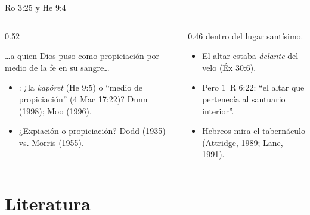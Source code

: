 \begin{frame}{Ro 3:25 y He 9:4}
\begin{columns}[t,onlytextwidth]
\begin{column}{0.52\textwidth}
\begin{cita}\ldots{}a quien Dios puso como propiciación por medio de la fe en su sangre\ldots{}\end{cita}
\scriptsize
\begin{itemize}
\item {}: ¿la \emph{kapóret} (He 9:5) o ``medio de propiciación'' (4 Mac 17:22)? Dunn (1998); Moo (1996).
\item ¿Expiación o propiciación? Dodd (1935) vs. Morris (1955).
\end{itemize}
\end{column}
\begin{column}{0.46\textwidth}\scriptsize
{} dentro del lugar santísimo.
\begin{itemize}
\item El altar estaba \emph{delante} del velo (Éx 30:6).
\item Pero 1~R 6:22: ``el altar que pertenecía al santuario interior''.
\item Hebreos mira el tabernáculo  (Attridge, 1989; Lane, 1991).
\end{itemize}
\end{column}
\end{columns}
\end{frame}

\section{Literatura}


